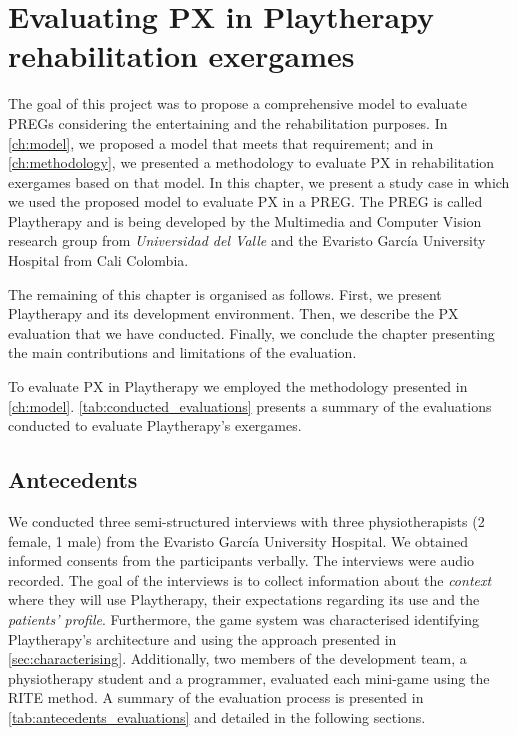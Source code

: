 \chapter{Evaluating PX in Playtherapy rehabilitation exergames}
\label{ch:playtherapy}
The goal of this project was to propose a comprehensive model to evaluate \acp{PREG} considering the entertaining and the rehabilitation purposes. In \autoref{ch:model}, we proposed a model that meets that requirement; and in \autoref{ch:methodology}, we presented a methodology to evaluate \ac{PX} in rehabilitation exergames based on that model. In this chapter, we present a study case in which we used the proposed model to evaluate \ac{PX} in a \ac{PREG}. The \ac{PREG} is called Playtherapy and is being developed by the Multimedia and Computer Vision research group from \textit{Universidad del Valle} and the Evaristo Garc\'ia University Hospital from Cali Colombia.

The remaining of this chapter is organised as follows. First, we present Playtherapy and its development environment. Then, we describe the \ac{PX} evaluation that we have conducted. Finally, we conclude the chapter presenting the main contributions and limitations of the evaluation.

To evaluate \ac{PX} in Playtherapy we employed the methodology presented in \autoref{ch:model}. \autoref{tab:conducted_evaluations} presents a summary of the evaluations conducted to evaluate Playtherapy's exergames.



\section{Antecedents}
We conducted three semi-structured interviews with three physiotherapists (2 female, 1 male) from the Evaristo Garc\'ia University Hospital. We obtained informed consents from the participants verbally. The interviews were audio recorded. The goal of the interviews is to collect information about the \emph{context} where they will use Playtherapy, their expectations regarding its use and the \emph{patients' profile}. Furthermore, the game system was characterised identifying Playtherapy's architecture and using the approach presented in \autoref{sec:characterising}. Additionally, two members of the development team, a physiotherapy student and a programmer, evaluated each mini-game using the \ac{RITE} method. A summary of the evaluation process is presented in \autoref{tab:antecedents_evaluations} and detailed in the following sections.

